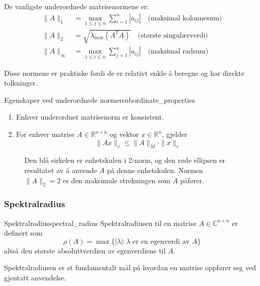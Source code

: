 \documentclass[../../main.tex]{subfiles}
\begin{document}
De vanligste underordnede matrisenormene er:
\begin{align*}
    \|A\|_1      & = \max_{1 \leq j \leq n} \sum_{i=1}^n |a_{ij}| \quad \text{(maksimal kolonnesum)} \\
    \|A\|_2      & = \sqrt{\lambda_{\max}(A^T A)} \quad \text{(største singulærverdi)}               \\
    \|A\|_\infty & = \max_{1 \leq i \leq n} \sum_{j=1}^n |a_{ij}| \quad \text{(maksimal radsum)}
\end{align*}

Disse normene er praktiske fordi de er relativt enkle å beregne og har direkte tolkninger.

\begin{theorem}{Egenskaper ved underordnede normer}{subordinate_properties}
    \begin{enumerate}
        \item Enhver underordnet matrisenorm er konsistent.
        \item For enhver matrise $A \in \mathbb{R}^{n \times n}$ og vektor $x \in \mathbb{R}^n$, gjelder
              \[
                  \|Ax\|_v \leq \|A\|_M \cdot \|x\|_v
              \]
    \end{enumerate}
\end{theorem}

\begin{figure}
    \centering
    
    \caption{Den blå sirkelen er enhetskulen i 2-norm, og den røde ellipsen er resultatet av å anvende $A$ på denne enhetskulen. Normen $\|A\|_2 = 2$ er den maksimale strekningen som $A$ påfører.}
    \label{fig:matrix_norm}
\end{figure}

\subsubsection{Spektralradius}

\begin{definition}{Spektralradius}{spectral_radius}
    Spektralradiusen til en matrise $A \in \mathbb{C}^{n \times n}$ er definert som
    \[
        \rho(A) = \max\{|\lambda| : \lambda \text{ er en egenverdi av } A\}
    \]
    altså den største absoluttverdien av egenverdiene til $A$.
\end{definition}

Spektralradiusen er et fundamentalt mål på hvordan en matrise oppfører seg ved gjentatt anvendelse.
\end{document}
